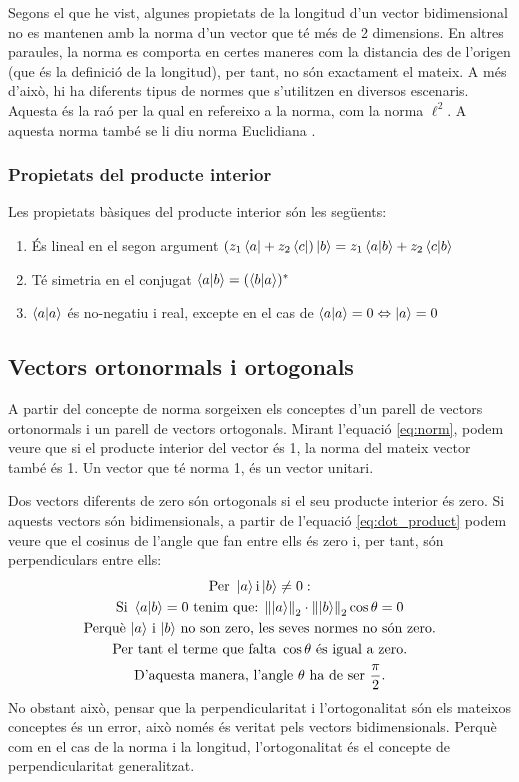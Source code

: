 Segons el que he vist, algunes propietats de la longitud d'un vector bidimensional no es mantenen amb la norma d'un vector que té més de 2 dimensions. En altres paraules, la norma es comporta en certes maneres com la distancia des de l'origen (que és la definició de la longitud), per tant, no són exactament el mateix. A més d'això, hi ha diferents tipus de normes que s'utilitzen en diversos escenaris. Aquesta és la raó per la qual en refereixo a la norma, com la norma $\ell^2$. A aquesta norma també se li diu norma Euclidiana \cite{wolfram:2norm}.

\subsubsection{Propietats del producte interior}
Les propietats bàsiques del producte interior són les següents:
\begin{enumerate}
	\item És lineal en el segon argument $ (z_1\bra{a}+ z_2\bra{c})\ket{b} = z_1\bra{a}\ket{b} + z_2\bra{c}\ket{b}$
	\item Té simetria en el conjugat $\bra{a}\ket{b} = (\bra{b}\ket{a})^*$
	\item $\bra{a}\ket{a}$ és no-negatiu i real, excepte en el cas de $\bra{a}\ket{a} = 0 \Leftrightarrow \ket{a} = 0$
\end{enumerate}

 
\subsection{Vectors ortonormals i ortogonals}
A partir del concepte de norma sorgeixen els conceptes d'un parell de vectors ortonormals i un parell de vectors ortogonals.
Mirant l'equació \eqref{eq:norm}, podem veure que si el producte interior del vector és 1, la norma del mateix vector també és 1. Un vector que té norma 1, és un vector unitari.

Dos vectors diferents de zero són ortogonals si el seu producte interior és zero. Si aquests vectors són bidimensionals, a partir de l'equació \eqref{eq:dot_product} podem veure que el cosinus de l'angle que fan entre ells és zero i, per tant, són perpendiculars entre ells:
\begin{multline*}
	 \text{Per }\ket{a} \text{i} \ket{b}\neq 0 : \\
	\text{Si }\bra{a}\ket{b} = 0 \text{ tenim que: } \norm{\ket{a}}_2 \cdot \norm{\ket{b}}_2 \cos \theta = 0 \\
	 \text{Perquè $\ket{a}$ i $\ket{b}$ no son zero, les seves normes no són zero.} \\
	 \text{Per tant el terme que falta } \cos\theta \text{ és igual a zero.} \\
	 \text{D'aquesta manera, l'angle $\theta$ ha de ser } \frac{\pi}{2}. \\
\end{multline*}
No obstant això, pensar que la perpendicularitat i l'ortogonalitat són els mateixos conceptes és un error, això només és veritat pels vectors bidimensionals. Perquè com en el cas de la norma i la longitud, l'ortogonalitat és el concepte de perpendicularitat generalitzat.

